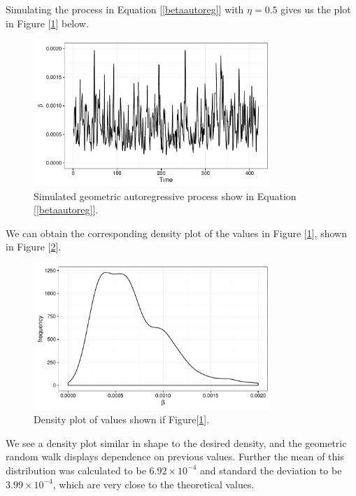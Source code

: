 	Simulating the process in Equation [\ref{betaautoreg}] with $\eta = 0.5$ gives us the plot in Figure [\ref{betaplot}] below.

	\begin{figure}[H]
        \centering
        \captionsetup{width=.8\linewidth}
        \includegraphics[width=0.8\textwidth]{./images/betaplot.pdf}
        \caption{Simulated geometric autoregressive process show in Equation [\ref{betaautoreg}].}
        \label{betaplot}
    \end{figure}

    We can obtain the corresponding density plot of the values in Figure [\ref{betaplot}], shown in Figure [\ref{betadensity}].

    \begin{figure}[H]
        \centering
        \captionsetup{width=.8\linewidth}
        \includegraphics[width=0.8\textwidth]{./images/betadensity.pdf}
        \caption{Density plot of values shown if Figure[\ref{betaplot}].}
        \label{betadensity}
    \end{figure}

    We see a density plot similar in shape to the desired density, and the geometric random walk displays dependence on previous values. Further the mean of this distribution was calculated to be $6.92 \times 10^{-4}$ and standard the deviation to be $3.99 \times 10^{-4}$, which are very close to the theoretical values.

